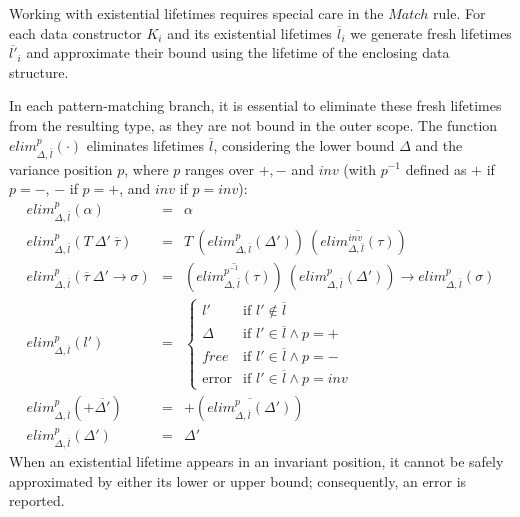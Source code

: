 \documentclass[11pt]{article}
\newcommand{\ap}{~}
\begin{document}
    Working with existential lifetimes requires special care in the $Match$ rule.
    For each data constructor $K_i$ and its existential lifetimes $\overline{l}_i$ we generate fresh lifetimes $\overline{l'}_i$ and approximate their bound using the lifetime of the enclosing data structure.

    In each pattern-matching branch, it is essential to eliminate these fresh lifetimes from the resulting type, as they are not bound in the outer scope.
    The function $elim_{\Delta, \overline{l}}^p(\cdot)$ eliminates lifetimes $\overline{l}$, considering the lower bound $\Delta$ and the variance position $p$, where $p$ ranges over $+, -$ and $inv$ (with $p^{-1}$ defined as $+$ if $p = -$, $-$ if $p = +$, and $inv$ if $p = inv$):
    \[
        \begin{array}{lll}
            elim_{\Delta, \overline{l}}^p(\alpha) & = & \alpha \\
            elim_{\Delta, \overline{l}}^p(T\ap \Delta'\ap\overline{\tau}) & = & T\ap \left( elim_{\Delta, \overline{l}}^p(\Delta') \right)\ap\left( \overline{elim_{\Delta, \overline{l}}^{inv}(\tau)} \right) \\
            elim_{\Delta, \overline{l}}^p(\overline{\tau}~\Delta'\to\sigma) & = & \left( \overline{elim_{\Delta, \overline{l}}^{p^{-1}}(\tau)} \right)~\left( elim_{\Delta, \overline{l}}^p(\Delta') \right)\to elim_{\Delta, \overline{l}}^{p}(\sigma) \\
            elim_{\Delta, \overline{l}}^{p}(l') & = &
            \begin{cases}
                l'     & \text{if } l' \not\in\overline{l} \\
                \Delta & \text{if } l' \in \overline{l} \land p = + \\
                free   & \text{if } l' \in \overline{l} \land p = - \\
                \text{error}  & \text{if } l' \in \overline{l} \land p = inv
            \end{cases} \\
            elim_{\Delta, \overline{l}}^{p}(+\overline{\Delta'}) & = & +\left( \overline{elim_{\Delta, \overline{l}}^{p}(\Delta')} \right) \\
            elim_{\Delta, \overline{l}}^{p}(\Delta') & = & \Delta'
        \end{array}
    \]
    When an existential lifetime appears in an invariant position, it cannot be safely approximated by either its lower or upper bound; consequently, an error is reported.
\end{document}
